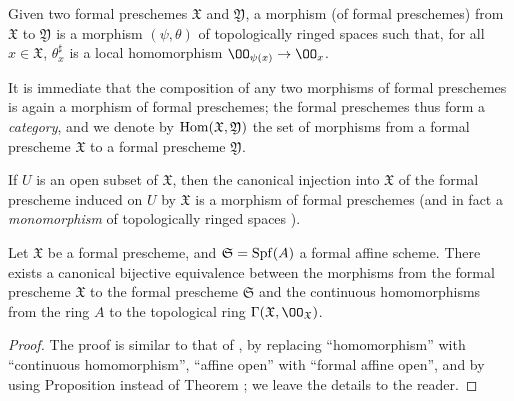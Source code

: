 \begin{defn}[10.4.5]
\label{1.10.4.5}
Given two formal preschemes $\mathfrak{X}$ and $\mathfrak{Y}$, a morphism (of formal preschemes) from $\mathfrak{X}$ to $\mathfrak{Y}$ is a morphism $(\psi,\theta)$ of topologically ringed spaces such that, for all $x\in\mathfrak{X}$, $\theta_x^\sharp$ is a local homomorphism $\OO_{\psi(x)}\to\OO_x$.
\end{defn}

It is immediate that the composition of any two morphisms of formal preschemes is again a morphism of formal preschemes; the formal preschemes thus form a \emph{category}, and we denote by $\operatorname{Hom}(\mathfrak{X},\mathfrak{Y})$ the set of morphisms from a formal prescheme $\mathfrak{X}$ to a formal prescheme $\mathfrak{Y}$.

If $U$ is an open subset of $\mathfrak{X}$, then the canonical injection into $\mathfrak{X}$ of the formal prescheme induced on $U$ by $\mathfrak{X}$ is a morphism of formal preschemes (and in fact a \emph{monomorphism} of topologically ringed spaces ).

\begin{prop}[10.4.6]
\label{1.10.4.6}
Let $\mathfrak{X}$ be a formal prescheme, and $\mathfrak{S}=\operatorname{Spf}(A)$ a formal affine scheme.
There exists a canonical bijective equivalence between the morphisms from the formal prescheme $\mathfrak{X}$ to the formal prescheme $\mathfrak{S}$ and the continuous homomorphisms from the ring $A$ to the topological ring $\Gamma(\mathfrak{X},\OO_\mathfrak{X})$.
\end{prop}

\begin{proof}
\label{proof-1.10.4.6}
The proof is similar to that of , by replacing ``homomorphism'' with ``continuous homomorphism'', ``affine open'' with ``formal affine open'', and by using Proposition  instead of Theorem ; we leave the details to the reader.
\end{proof}


